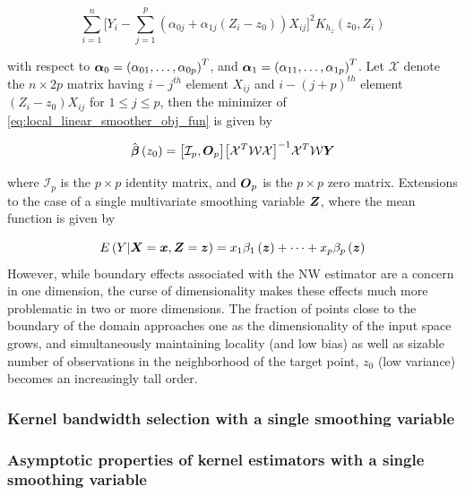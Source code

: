 \documentclass[12pt]{article}
\newcommand{\bfbeta}{\mbox{\boldmath $\beta$}}
\newcommand{\bfalpha}{\mbox{\boldmath $\alpha$}}
\newcommand{\bfO}{\mbox{\boldmath $O$}}
\newcommand{\bfx}{\mbox{\boldmath $x$}}
\newcommand{\bfX}{\mbox{\boldmath $X$}}
\newcommand{\bfz}{\mbox{\boldmath $z$}}
\newcommand{\bfY}{\mbox{\boldmath $Y$}}
\newcommand{\bfZ}{\mbox{\boldmath $Z$}}
\begin{document}
\begin{equation} \label{local_linear_smoother_obj_fun} 
\sum_{i=1}^n \Big[Y_i - \sum_{j=1}^p \left(\alpha_{0j}+\alpha_{1j}\left(Z_i - z_0 \right)\right)X_{ij}\Big]^2 K_{h_z}\left(z_0,Z_i\right)
\end{equation} 
 
 \noindent
 with respect to $\bfalpha_0 = \left( \alpha_{01}, \dots, \alpha_{0p}\right)^T$, and $\bfalpha_1 = \left( \alpha_{11}, \dots, \alpha_{1p}\right)^T$. Let $\mathcal{X}$ denote the $n \times 2p$ matrix having $i-j^{th}$ element $X_{ij}$ and $i-\left(j+p\right)^{th}$ element $\left(Z_i - z_0\right)X_{ij}$ for $1 \le  j \le p$, then the minimizer of \ref{eq:local_linear_smoother_obj_fun} is given by 
 
\begin{equation} \nonumber
\hat{\bfbeta}\left(z_0\right) = \big[ \mathcal{I}_p, \bfO_p \big]\big[\mathcal{X}^T\mathcal{W}\mathcal{X}\big]^{-1} \mathcal{X}^T\mathcal{W} \bfY
\end{equation}   

\noindent
where $\mathcal{I}_p$ is the $p \times p$ identity matrix, and $\bfO_p$ is the $p \times p$ zero matrix. Extensions to the case of a single multivariate smoothing variable $\bfZ$, where the mean function is given by 

\[
E\left(Y \vert \bfX=\bfx, \bfZ=\bfz \right) = x_1\beta_1\left(\bfz\right) + \dots  + x_p\beta_p\left(\bfz\right)
\]
\noindent
However, while boundary effects associated with the NW estimator are a concern in one dimension, the curse of dimensionality makes these effects much more problematic in two or more dimensions. The fraction of points close to the boundary of the domain approaches one as the dimensionality of the input space grows, and simultaneously maintaining locality (and low bias) as well as sizable number of observations in the neighborhood of the target point, $z_0$ (low variance) becomes an increasingly tall order. 

\subsubsection{Kernel bandwidth selection with a single smoothing variable} \label{single_smoothing_var_bandwidth_selection}
\subsubsection{Asymptotic properties of kernel estimators with a single smoothing variable}
\end{document}
